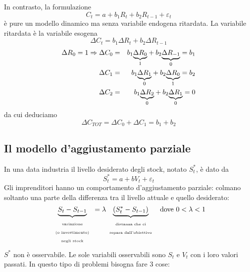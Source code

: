 \documentclass[a4paper]{report}
\theoremstyle{remark}
\begin{document}
\noindent In contrasto, la formulazione 
\begin{equation*}
C_{t}=a+b_{1}R_{t}+b_{2}R_{t-1}+\varepsilon _{t}
\end{equation*}%
\`{e} pure un modello dinamico ma senza variabile endogena ritardata. La
variabile ritardata \`{e} la variabile esogena%
\begin{equation*}
\Delta C_{t}=b_{1}\Delta R_{t}+b_{2}\Delta R_{t-1}
\end{equation*}%
\begin{eqnarray*}
\Delta R_{0}=1\Rightarrow \Delta C_{0} &=&b_{1}\underset{1}{\underbrace{%
\Delta R_{0}}}+b_{2}\underset{0}{\underbrace{\Delta R_{-1}}}=b_{1} \\
\Delta C_{1} &=&b_{1}\underset{0}{\underbrace{\Delta R_{1}}}+b_{2}\underset{1%
}{\underbrace{\Delta R_{0}}}=b_{2} \\
\Delta C_{2} &=&b_{1}\underset{0}{\underbrace{\Delta R_{2}}}+b_{2}\underset{0%
}{\underbrace{\Delta R_{1}}}=0
\end{eqnarray*}%
da cui deduciamo%
\begin{equation*}
\Delta C_{TOT}=\Delta C_{0}+\Delta C_{1}=b_{1}+b_{2}
\end{equation*}%
\pagebreak

\subsection{Il modello d'aggiustamento parziale}

In una data industria il livello desiderato degli stock, notato $S_{t}^{\ast
}$, \`{e} dato da 
\begin{equation}
S_{t}^{\ast }=a+bV_{t}+\varepsilon _{t}  \label{livello stock}
\end{equation}%
Gli imprenditori hanno un comportamento d'aggiustamento parziale: colmano
soltanto una parte della differenza tra il livello attuale e quello
desiderato:%
\begin{equation}
\underset{%
\begin{array}{c}
\text{{\tiny variazione}} \\ 
\text{{\tiny (o investimento)}} \\ 
\text{{\tiny negli stock}}%
\end{array}%
}{\underbrace{S_{t}-S_{t-1}}}=\lambda \underset{%
\begin{array}{c}
\text{{\tiny distanza che ci}} \\ 
\text{{\tiny separa dall'obiettivo}}%
\end{array}%
}{\underbrace{\left( S_{t}^{\ast }-S_{t-1}\right) }}\text{ \ dove }0<\lambda
<1  \label{aggiustamento livello stock}
\end{equation}%
$S^{\ast }$ non \`{e} osservabile. Le sole variabili osservabili sono $S_{t}$
e $V_{t}$ con i loro valori passati. In questo tipo di problemi bisogna fare
3 cose:
\end{document}
